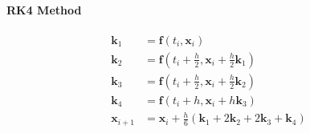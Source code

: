 \documentclass[a4paper,12pt]{article}
\begin{document}
	\paragraph{RK4 Method}
	\begin{align*}
		\mathbf{k}_1 &= \mathbf{f}(t_i, \mathbf{x}_i) \\
		\mathbf{k}_2 &= \mathbf{f}\left(t_i + \frac{h}{2}, \mathbf{x}_i + \frac{h}{2}\mathbf{k}_1\right) \\
		\mathbf{k}_3 &= \mathbf{f}\left(t_i + \frac{h}{2}, \mathbf{x}_i + \frac{h}{2}\mathbf{k}_2\right) \\
		\mathbf{k}_4 &= \mathbf{f}(t_i + h, \mathbf{x}_i + h\mathbf{k}_3) \\
		\mathbf{x}_{i+1} &= \mathbf{x}_i + \frac{h}{6}(\mathbf{k}_1 + 2\mathbf{k}_2 + 2\mathbf{k}_3 + \mathbf{k}_4)
	\end{align*}
	
\end{document}
